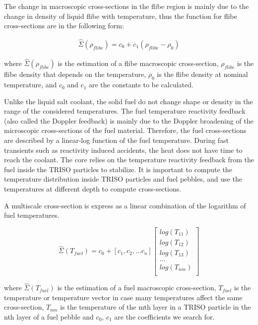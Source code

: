 \documentclass{elsarticle}
\begin{document}
The change in macroscopic cross-sections in the flibe region is mainly due to the change in density of liquid flibe with temperature, thus the function for flibe cross-sections are in the following form:

\begin{align}
  \hat{\Sigma}(\rho_{flibe}) = c_0 + c_1(\rho_{flibe} - \rho_0)
  \label{eq:flibe_xs}
\end{align}

where $\hat{\Sigma}(\rho_{flibe})$ is the estimation of a flibe macroscopic cross-section, $\rho_{flibe}$ is the flibe density that depends on the temperature, $\rho_0$ is the flibe density at nominal temperature, and 
$c_0$ and $c_1$ are the constants to be calculated.

Unlike the liquid salt coolant, the solid fuel do not change shape or density in the range of the considered temperatures. The fuel temperature reactivity feedback (also called the Doppler feedback) is mainly due to the Doppler broadening of the microscopic cross-sections of the fuel material.
Therefore, the fuel cross-sections are described by a linear-log function of the fuel temperature. During fast transients such as reactivity induced accidents, the heat does not have time to reach the coolant. The core relies on the temperature reactivity feedback from the fuel inside the TRISO particles to stabilize. It is important to compute the temperature distribution inside TRISO particles and fuel pebbles, and use the temperatures at different depth to compute cross-sections. 

A multiscale cross-section is express as a linear combination of the logarithm of fuel temperatures. 

\begin{equation}
\hat{\Sigma} (T_{fuel}) = c_0 + [c_1, c_2, ... c_n] \begin{bmatrix}
    log(T_{11}) \\
    log(T_{12}) \\
    log(T_{13}) \\
    ...\\
    log(T_{nm})\\
\end{bmatrix}
\label{eq:linear_log}
\end{equation}


where $\hat{\Sigma}(T_{fuel})$ is the estimation of a fuel macroscopic cross-section, $T_{fuel}$ is the temperature or temperature vector in case many temperatures affect the same cross-section, $T_{nm}$ is the temperature of the mth layer in a TRISO particle in the nth layer of a fuel pebble and $c_0$, $c_1$ are the coefficients we search for.
\end{document}
